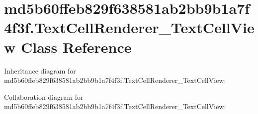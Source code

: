 \hypertarget{classmd5b60ffeb829f638581ab2bb9b1a7f4f3f_1_1_text_cell_renderer___text_cell_view}{}\section{md5b60ffeb829f638581ab2bb9b1a7f4f3f.\+Text\+Cell\+Renderer\+\_\+\+Text\+Cell\+View Class Reference}
\label{classmd5b60ffeb829f638581ab2bb9b1a7f4f3f_1_1_text_cell_renderer___text_cell_view}


Inheritance diagram for md5b60ffeb829f638581ab2bb9b1a7f4f3f.\+Text\+Cell\+Renderer\+\_\+\+Text\+Cell\+View\+:


Collaboration diagram for md5b60ffeb829f638581ab2bb9b1a7f4f3f.\+Text\+Cell\+Renderer\+\_\+\+Text\+Cell\+View\+:
